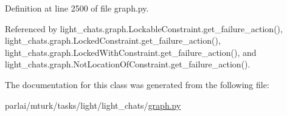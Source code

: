 Definition at line 2500 of file graph.\+py.



Referenced by light\+\_\+chats.\+graph.\+Lockable\+Constraint.\+get\+\_\+failure\+\_\+action(), light\+\_\+chats.\+graph.\+Locked\+Constraint.\+get\+\_\+failure\+\_\+action(), light\+\_\+chats.\+graph.\+Locked\+With\+Constraint.\+get\+\_\+failure\+\_\+action(), and light\+\_\+chats.\+graph.\+Not\+Location\+Of\+Constraint.\+get\+\_\+failure\+\_\+action().



The documentation for this class was generated from the following file\+:\begin{DoxyCompactItemize}
\item 
parlai/mturk/tasks/light/light\+\_\+chats/\hyperlink{parlai_2mturk_2tasks_2light_2light__chats_2graph_8py}{graph.\+py}\end{DoxyCompactItemize}

